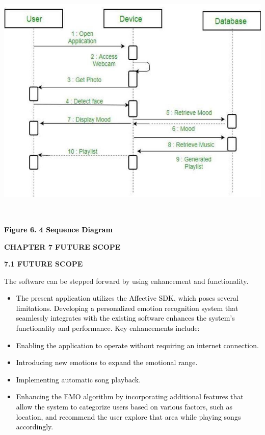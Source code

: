 \documentclass[a4paper]{article}
\newcommand\liststyleWWNumiii{%
\renewcommand\labelitemi{${\bullet}$}
\renewcommand\labelitemii{o}
\renewcommand\labelitemiii{${\blacksquare}$}
\renewcommand\labelitemiv{${\bullet}$}
}
\begin{document}
 \includegraphics[width=6.2311in,height=4.6701in]{rahulop-img011.jpg} 

{\centering
\hypertarget{1pxezwc}{}\textbf{\textcolor{black}{Figure 6. 4 Sequence Diagram}}
\par}

\clearpage\setcounter{page}{1}\pagestyle{Convertedxii}
{\bfseries
\hypertarget{49x2ik5}{}CHAPTER 7 FUTURE SCOPE \ }


\bigskip

{\bfseries
\hypertarget{2p2csry}{}7.1 FUTURE SCOPE}


\bigskip

The software can be stepped forward by using enhancement and functionality. 

\liststyleWWNumiii
\begin{itemize}
\item \textcolor{black}{The present application utilizes the Affective SDK, which poses several limitations. Developing
a personalized emotion recognition system that seamlessly integrates with the existing software enhances the system's
functionality and performance. Key enhancements include:}
\item \textcolor{black}{Enabling the application to operate without requiring an internet connection.}
\item \textcolor{black}{Introducing new emotions to expand the emotional range.}
\item \textcolor{black}{Implementing automatic song playback.}
\item \textcolor{black}{Enhancing the EMO algorithm by incorporating additional features that allow the system to
categorize users based on various factors, such as location, and recommend the user explore that area while playing
songs accordingly.}
\end{itemize}
\end{document}
